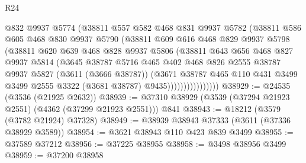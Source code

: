 \begin{lexlean}{R24}
\begin{coremodule}
                      @832
                      @9937
                      @5774
                      (@38811
                        @557
                        @582
                        @468
                        @831
                        @9937
                        @5782
                        (@38811
                          @586
                          @605
                          @468
                          @830
                          @9937
                          @5790
                          (@38811
                            @609
                            @616
                            @468
                            @829
                            @9937
                            @5798
                            (@38811
                              @620
                              @639
                              @468
                              @828
                              @9937
                              @5806
                              (@38811
                                @643
                                @656
                                @468
                                @827
                                @9937
                                @5814
                                (@3645
                                  @38787
                                  @5716
                                  @465
                                  @402
                                  @468
                                  @826
                                  @2555
                                  @38787
                                  @9937
                                  @5827
                                  (@3611 (@3666 @38787))
                                  (@3671
                                    @38787
                                    @465
                                    @110
                                    @431
                                    @3499
                                    @3499
                                    @2555
                                    @3322
                                    (@3681 @38787)
                                    @9435))))))))))))))))
@38929 := @24535 (@3536 (@21925 @2632))
@38939 := @37310 @38929 (@3539 (@37294 @21923 @2551) (@4362 (@37299 @21923 @2551))) @841
@38943 := @18212 (@3579 (@3782 @21924) @37328)
@38949 := @38939 @38943 @37333 (@3611 (@37336 @38929 @3589))
@38954 := @3621 @38943 @110 @423 @839 @3499
@38955 := @37589 @37212
@38956 := @37225 @38955
@38958 := @3498 @38956 @3499
@38959 := @37200 @38958

\end{coremodule}
\end{lexlean}
